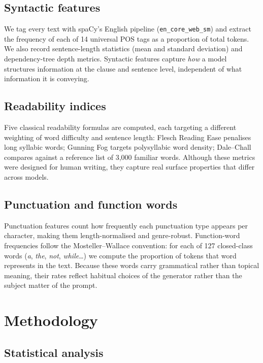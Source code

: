 \documentclass[11pt,a4paper]{article}
\begin{document}
\subsection{Syntactic features}

We tag every text with spaCy's English pipeline (\texttt{en\_core\_web\_sm})
and extract the frequency of each of 14 universal POS tags as a
proportion of total tokens. We also record sentence-length statistics
(mean and standard deviation) and dependency-tree depth metrics.
Syntactic features capture \emph{how} a model structures information
at the clause and sentence level, independent of what information it
is conveying.

\subsection{Readability indices}

Five classical readability formulas are computed, each targeting a
different weighting of word difficulty and sentence length:
Flesch Reading Ease penalises long syllabic words; Gunning Fog targets
polysyllabic word density; Dale--Chall compares against a reference
list of 3,000 familiar words. Although these metrics were designed
for human writing, they capture real surface properties that differ
across models.

\subsection{Punctuation and function words}

Punctuation features count how frequently each punctuation type
appears per character, making them length-normalised and
genre-robust. Function-word frequencies follow the Mosteller--Wallace
convention: for each of 127 closed-class words (\textit{a}, \textit{the},
\textit{not}, \textit{while}\ldots) we compute the proportion of
tokens that word represents in the text. Because these words carry
grammatical rather than topical meaning, their rates reflect
habitual choices of the generator rather than the subject matter of
the prompt.

\section{Methodology}
\label{sec:method}

\subsection{Statistical analysis}
\end{document}
